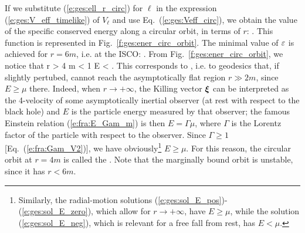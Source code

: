 If we substitute (\ref{e:ges:ell_r_circ}) for $\ell$ in
the expression (\ref{e:ges:V_eff_timelike}) of $V_{\ell}$
and use Eq.~(\ref{e:ges:Veff_circ}), we obtain the value of the
specific conserved energy along a circular orbit, in terms of $r$:
\be \label{e:ges:eps_r_circ}
     .
\ee
This function is represented in Fig.~\ref{f:ges:ener_circ_orbit}.
The minimal value of $\varepsilon$ is achieved for $r=6m$, i.e. at the ISCO:
\be
     .
\ee
From Fig.~\ref{f:ges:ener_circ_orbit}, we notice that
\be \label{e:ges:r_marginally_bound}
    r > 4 m \iff \veps < 1 \iff E < \mu .
\ee
This corresponds to ,
i.e. to geodesics that, if slightly pertubed, cannot reach the asymptotically
flat region $r\gg 2m$, since $E \geq \mu$ there. Indeed, when
$r\rightarrow +\infty$, the Killing vector $\bm{\xi}$ can be interpreted
as the 4-velocity of some asymptotically inertial observer (at rest with
respect to the black hole) and $E$ is the particle energy measured by
that observer; the famous Einstein relation (\ref{e:fra:E_Gam_m}) is then
$E = \Gamma \mu$, where $\Gamma$ is the Lorentz factor
of the particle with respect to the observer.
Since $\Gamma \geq 1$ [Eq.~(\ref{e:fra:Gam_V2})], we have obviously\footnote{Similarly,
the radial-motion solutions (\ref{e:ges:sol_E_pos})-(\ref{e:ges:sol_E_zero}), which
allow for $r\rightarrow +\infty$, have $E \geq\mu$, while the solution (\ref{e:ges:sol_E_neg}),
which is relevant for a free fall from rest, has $E < \mu$.} $E \geq \mu$.
For this reason, the circular orbit at $r=4m$ is called the
. Note that the marginally bound orbit is unstable, since it has $r<6m$.

